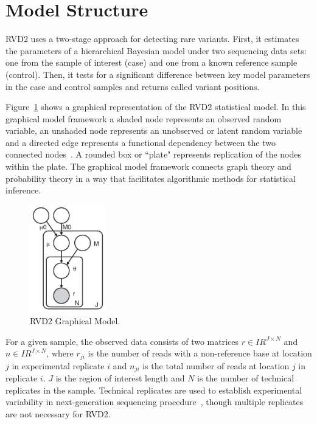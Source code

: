 \documentclass{bioinfo}
\newcommand{\RR}{I\!\!R} %
\begin{document}
\section{Model Structure}\label{sec:model_structure}

RVD2 uses a two-stage approach for detecting rare variants. First, it estimates the parameters of a hierarchical Bayesian model under two sequencing data sets: one from the sample of interest (case) and one from a known reference sample (control). Then, it tests for a significant difference between key model parameters in the case and control samples and returns called variant positions.

Figure~\ref{fig:graphical_model} shows a graphical representation of the RVD2 statistical model. In this graphical model framework a shaded node represents an observed random variable, an unshaded node represents an unobserved or latent random variable and a directed edge represents a functional dependency between the two connected nodes~\citep{jordan2004graphical}. A rounded box or ``plate" represents replication of the nodes within the plate. The graphical model framework connects graph theory and probability theory in a way that facilitates algorithmic methods for statistical inference.

\begin{figure}[!bpth]
\centering
\vspace{-10pt}
\includegraphics[width=33mm]{pdf_figs/RVD2_model.pdf}
\caption{RVD2 Graphical Model.}
\vspace{-20pt}
\label{fig:graphical_model}
\end{figure}

For a given sample, the observed data consists of two matrices $r \in \RR^{J \times N}$ and $n \in \RR^{J \times N}$, where $r_{ji}$ is the number of reads with a non-reference base at location $j$ in experimental replicate $i$ and $n_{ji}$ is the total number of reads at location $j$ in replicate $i$. $ J $ is the region of interest length and $ N $ is the number of technical replicates in the sample.\label{replicate definition} Technical replicates are used to establish experimental variability in next-generation sequencing procedure~\citep{robasky2013role}, though multiple replicates are not necessary for RVD2.
\end{document}
